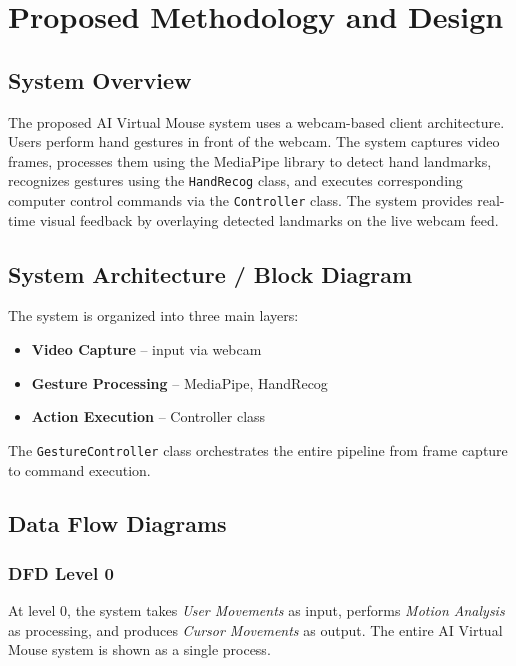 \documentclass[12pt,a4paper]{report}
\begin{document}
\chapter{Proposed Methodology and Design}

\section{System Overview}

The proposed AI Virtual Mouse system uses a webcam-based client architecture. Users perform hand
gestures in front of the webcam. The system captures video frames, processes them using the
MediaPipe library to detect hand landmarks, recognizes gestures using the \texttt{HandRecog}
class, and executes corresponding computer control commands via the \texttt{Controller} class.
The system provides real-time visual feedback by overlaying detected landmarks on the live
webcam feed.

\section{System Architecture / Block Diagram}

The system is organized into three main layers:
\begin{itemize}[noitemsep]
  \item \textbf{Video Capture} -- input via webcam
  \item \textbf{Gesture Processing} -- MediaPipe, HandRecog
  \item \textbf{Action Execution} -- Controller class
\end{itemize}

The \texttt{GestureController} class orchestrates the entire pipeline from frame capture to
command execution.

\section{Data Flow Diagrams}

\subsection{DFD Level 0}

At level 0, the system takes \textit{User Movements} as input, performs \textit{Motion
Analysis} as processing, and produces \textit{Cursor Movements} as output. The entire AI
Virtual Mouse system is shown as a single process.
\end{document}
